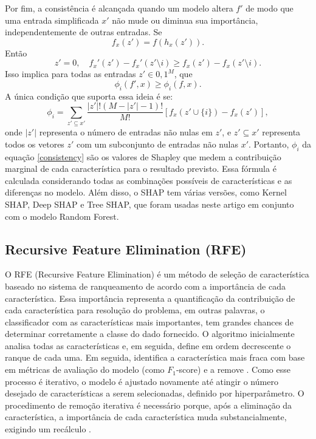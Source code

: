 Por fim, a consistência é alcançada quando um modelo altera $f'$ de modo que uma entrada simplificada $x'$ não mude ou diminua sua importância, independentemente de outras entradas.
Se
\[
  f_{x}(z') = f(h_{x}(z')).
\]
Então
\[
  z' = 0,\quad f_{x}'(z') - f_{x}'(z' \setminus i) \ge f_{x}(z') - f_{x}(z' \setminus i).
\]
Isso implica para todas as entradas $z' \in {0,1}^{M}$, que
\[
  \phi_{i}(f', x) \ge \phi_{i}(f, x).
\]
A única condição que suporta essa ideia é se:
\begin{equation}
  \label{consistency}
  \phi_{i} = \sum_{z' \subseteq x'}^{}\frac{\left| z' \right|!(M - \left| z' \right| - 1)!}{M!} \left[ f_{x}(z' \cup \{i\}) - f_{x} (z') \right],
\end{equation}
onde $|z'|$ representa o número de entradas não nulas em $z'$, e $z' \subseteq x'$ representa todos os vetores $z'$ com um subconjunto de entradas não nulas $x'$. Portanto, $\phi_{i}$ da equação \ref{consistency} são os valores de Shapley que medem a contribuição marginal de cada característica para o resultado previsto. Essa fórmula é calculada considerando todas as combinações possíveis de características e as diferenças no modelo. Além disso, o SHAP tem várias versões, como Kernel SHAP, Deep SHAP e Tree SHAP, que foram usadas neste artigo em conjunto com o modelo Random Forest.

\subsection{Recursive Feature Elimination (RFE)}

O RFE (Recursive Feature Elimination) é um método de seleção de característica baseado no sistema de ranqueamento de acordo com a importância de cada característica. Essa importância representa a quantificação da contribuição de cada característica para resolução do problema, em outras palavras, o classificador com as características mais importantes, tem grandes chances de determinar corretamente a classe do dado fornecido. O algoritmo inicialmente analisa todas as características e, em seguida, define em ordem decrescente o ranque de cada uma. Em seguida, identifica a característica mais fraca com base em métricas de avaliação do modelo (como $F_{1}$-score) e a remove \cite{granitto2006recursive}. Como esse processo é iterativo, o modelo é ajustado novamente até atingir o número desejado de características a serem selecionadas, definido por hiperparâmetro. O procedimento de remoção iterativa é necessário porque, após a eliminação da característica, a importância de cada característica muda substancialmente, exigindo um recálculo \cite{guyon2002mach}.

